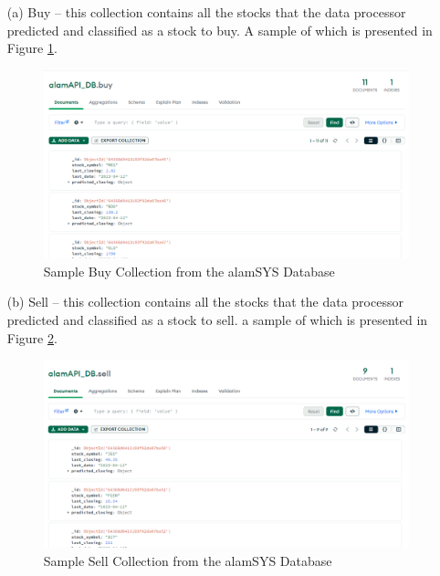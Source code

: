 \begin{itemize}
    \item[(a)] Buy – this collection contains all the stocks that the 
    data processor predicted and classified as a stock to buy. A sample
    of which is presented in Figure \ref{fig:odm_buy_sample}.
    \begin{figure}[ht]
        \centering
        \includegraphics[width=1\textwidth]{./assets/Chapter_3/ODM/ODM_Buy_Sample.png}
        \caption{Sample Buy Collection from the alamSYS Database}
        \label{fig:odm_buy_sample}
    \end{figure}
    \FloatBarrier

    \item[(b)] Sell – this collection contains all the stocks that the
    data processor predicted and classified as a stock to sell. a
    sample of which is presented in Figure \ref{fig:odm_sell_sample}.
    \begin{figure}[ht]
        \centering
        \includegraphics[width=1\textwidth]{./assets/Chapter_3/ODM/ODM_Sell_Sample.png}
        \caption{Sample Sell Collection from the alamSYS Database}
        \label{fig:odm_sell_sample}
    \end{figure}
    \FloatBarrier


\end{itemize}
